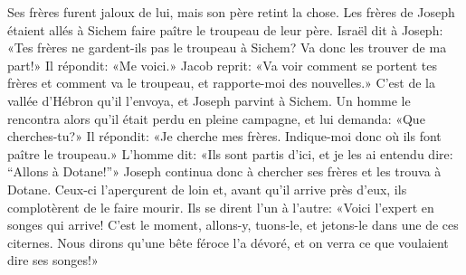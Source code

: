 Ses frères furent jaloux de lui, mais son père retint la chose.
Les frères de Joseph étaient allés à Sichem faire paître le troupeau de leur père.
Israël dit à Joseph: «Tes frères ne gardent-ils pas le troupeau à Sichem?
	Va donc les trouver de ma part!»
	Il répondit: «Me voici.»
Jacob reprit: «Va voir comment se portent tes frères et comment va le troupeau,
	et rapporte-moi des nouvelles.»
C’est de la vallée d’Hébron qu’il l’envoya, et Joseph parvint à Sichem.
Un homme le rencontra alors qu’il était perdu en pleine campagne,
	et lui demanda: «Que cherches-tu?»
Il répondit: «Je cherche mes frères.
	Indique-moi donc où ils font paître le troupeau.»
L’homme dit: «Ils sont partis d’ici,
	et je les ai entendu dire: “Allons à Dotane!”»
	Joseph continua donc à chercher ses frères et les trouva à Dotane.
Ceux-ci l’aperçurent de loin
	et, avant qu’il arrive près d’eux, ils complotèrent de le faire mourir.
Ils se dirent l’un à l’autre: «Voici l’expert en songes qui arrive!
	C’est le moment, allons-y, tuons-le, et jetons-le dans une de ces citernes.
Nous dirons qu’une bête féroce l’a dévoré,
	et on verra ce que voulaient dire ses songes!»
